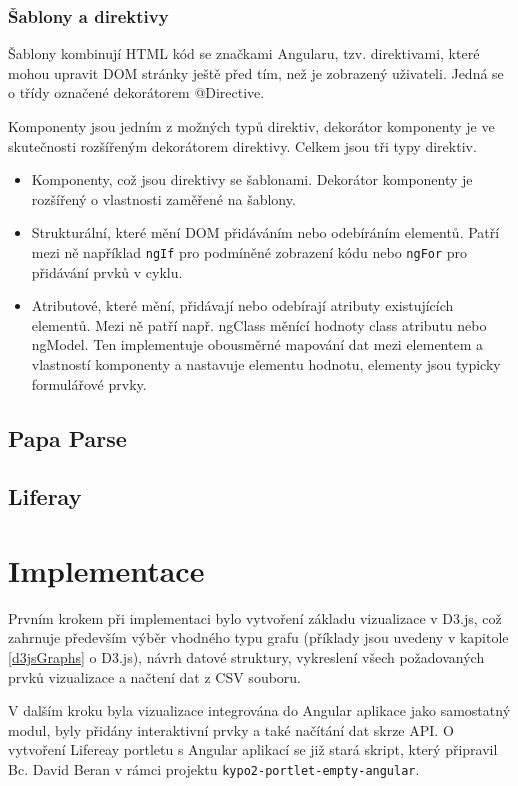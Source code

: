 \documentclass[
  digital, %
  oneside, %
  table,   %
  nolof,     %
  nolot,     %
]{fithesis3}
\begin{document}
\subsection{Šablony a direktivy}
Šablony kombinují HTML kód se značkami Angularu, tzv. direktivami, které mohou upravit DOM stránky ještě před tím, než je zobrazený uživateli. Jedná se o třídy označené dekorátorem @Directive.\par
Komponenty jsou jedním z možných typů direktiv, dekorátor komponenty je ve skutečnosti rozšířeným dekorátorem direktivy. Celkem jsou tři typy direktiv.
\begin{itemize}
  \item Komponenty, což jsou direktivy se šablonami. Dekorátor komponenty je rozšířený o vlastnosti zaměřené na šablony.
  \item Strukturální, které mění DOM přidáváním nebo odebíráním elementů. Patří mezi ně například \verb|ngIf| pro podmíněné zobrazení kódu nebo \verb|ngFor| pro přidávání prvků v cyklu.
  \item Atributové, které mění, přidávají nebo odebírají atributy existujících elementů. Mezi ně patří např. ngClass měnící hodnoty class atributu nebo ngModel. Ten implementuje obousměrné mapování dat mezi elementem a vlastností komponenty a nastavuje elementu hodnotu, elementy jsou typicky formulářové prvky.
\end{itemize}

\section{Papa Parse}
\section{Liferay} \label{liferay}

\chapter{Implementace}
Prvním krokem při implementaci bylo vytvoření základu vizualizace v D3.js, což zahrnuje především výběr vhodného typu grafu (příklady jsou uvedeny v kapitole \ref{d3jsGraphs} o D3.js), návrh datové struktury, vykreslení všech požadovaných prvků vizualizace a načtení dat z CSV souboru.\par
V dalším kroku byla vizualizace integrována do Angular aplikace jako samostatný modul, byly přidány interaktivní prvky a také načítání dat skrze API. O vytvoření Lifereay portletu s Angular aplikací se již stará skript, který připravil Bc. David Beran v rámci projektu \verb|kypo2-portlet-empty-angular|.
\end{document}
